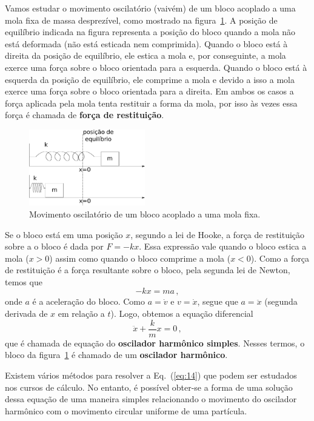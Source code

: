 \documentclass[twocolumn=on,fontsize=12pt,DIV=calc]{scrartcl}
\theoremstyle{definition}
\begin{document}
Vamos estudar o movimento oscilatório (vaivém) de um bloco acoplado a
uma mola fixa de massa desprezível, como mostrado na
figura~\ref{fig:massamola}. A posição de equilíbrio indicada na figura
representa a posição do bloco quando a mola não está deformada (não
está esticada nem comprimida). Quando o bloco está à direita da
posição de equilíbrio, ele estica a mola e, por conseguinte, a mola
exerce uma força sobre o bloco orientada para a esquerda. Quando o
bloco está à esquerda da posição de equilíbrio, ele comprime a mola e
devido a isso a mola exerce uma força sobre o bloco orientada para a
direita. Em ambos os casos a força aplicada pela mola tenta restituir
a forma da mola, por isso às vezes essa força é chamada de
\textbf{força de restituição}.
\begin{figure}[ht]
  \centering
  \includegraphics[width=0.45\textwidth,keepaspectratio]{aux/massamola.pdf}
  \caption{Movimento oscilatório de um bloco acoplado a uma mola
    fixa.}
  \label{fig:massamola}
\end{figure}

Se o bloco está em uma posição $x$, segundo a lei de Hooke, a força de
restituição sobre a o bloco é dada por $F=-kx$. Essa expressão vale
quando o bloco estica a mola ($x>0$) assim como quando o bloco
comprime a mola ($x<0$). Como a força de restituição é a força
resultante sobre o bloco, pela segunda lei de Newton, temos que
$$-kx=ma\,,$$
onde $a$ é a aceleração do bloco. Como $a=\dot v$ e $v=\dot x$, segue
que $a=\ddot x$ (segunda derivada de $x$ em relação a $t$). Logo,
obtemos a equação diferencial
\begin{equation}
  \label{eq:14}
  \ddot x+\frac{k}{m}x=0\,,
\end{equation}
que é chamada de equação do \textbf{oscilador harmônico
  simples}. Nesses termos, o bloco da figura~\ref{fig:massamola} é
chamado de um \textbf{oscilador harmônico}.

Existem vários métodos para resolver a Eq.~(\ref{eq:14}) que podem ser
estudados nos cursos de cálculo. No entanto, é possível obter-se a
forma de uma solução dessa equação de uma maneira simples relacionando
o movimento do oscilador harmônico com o movimento circular uniforme
de uma partícula.
\end{document}
